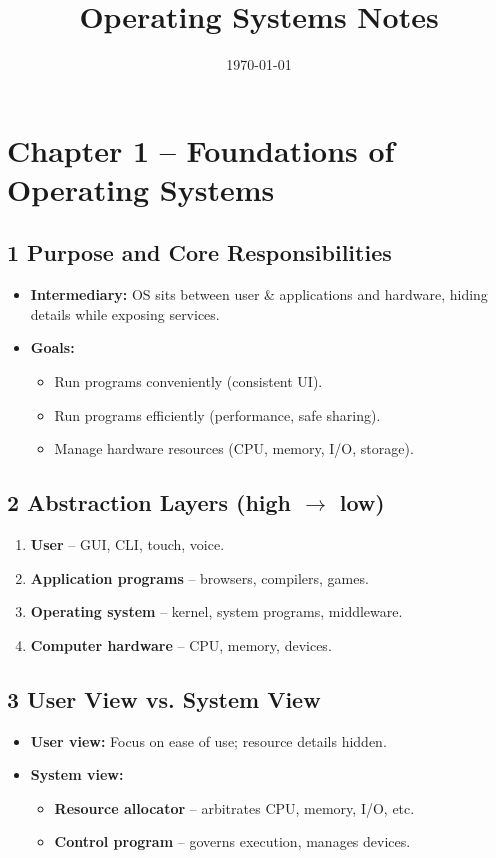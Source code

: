 \documentclass{article}
\title{Operating Systems Notes}
\author{} %
\date{\today}
\begin{document}
\maketitle
\tableofcontents
\newpage

\section*{Chapter 1 – Foundations of Operating Systems}
\subsection*{1 Purpose and Core Responsibilities}
\begin{itemize}
    \item \textbf{Intermediary:} OS sits between user \& applications and hardware, hiding details while exposing services.
    \item \textbf{Goals:}
    \begin{itemize}
        \item Run programs conveniently (consistent UI).
        \item Run programs efficiently (performance, safe sharing).
        \item Manage hardware resources (CPU, memory, I/O, storage).
    \end{itemize}
\end{itemize}

\subsection*{2 Abstraction Layers (high $\rightarrow$ low)}
\begin{enumerate}[label=\arabic*.]
    \item \textbf{User} – GUI, CLI, touch, voice.
    \item \textbf{Application programs} – browsers, compilers, games.
    \item \textbf{Operating system} – kernel, system programs, middleware.
    \item \textbf{Computer hardware} – CPU, memory, devices.
\end{enumerate}

\subsection*{3 User View vs. System View}
\begin{itemize}
    \item \textbf{User view:} Focus on ease of use; resource details hidden.
    \item \textbf{System view:}
    \begin{itemize}
        \item \textbf{Resource allocator} – arbitrates CPU, memory, I/O, etc.
        \item \textbf{Control program} – governs execution, manages devices.
    \end{itemize}
\end{itemize}
\end{document}
